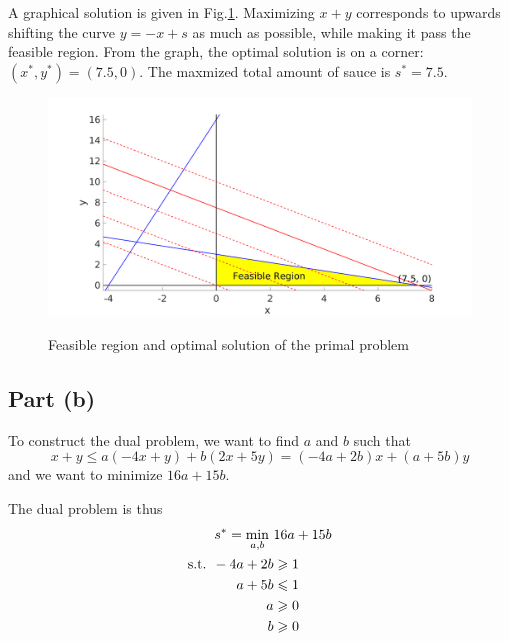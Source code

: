 \documentclass{article}
\begin{document}
A graphical solution is given in Fig.\ref{primal}. Maximizing $x+y$ corresponds to upwards shifting the curve $y=-x+s$ as much as possible, while making it pass the feasible region. From the graph, the optimal solution is on a corner: $(x^*,y^*)=(7.5,0)$. The maxmized total amount of sauce is $s^*=7.5$.
\begin{figure}[!htbp]
\centering
\includegraphics[width=12cm]{problem2a.png}\\
\caption{Feasible region and optimal solution of the primal problem}\label{primal}
\end{figure}

\subsection{Part (b)}
To construct the dual problem, we want to find $a$ and $b$ such that
\begin{equation*}
x+y\leqslant a(-4x+y)+b(2x+5y)=(-4a+2b)x+(a+5b)y
\end{equation*}
and we want to minimize $16a+15b$.

The dual problem is thus
\begin{align*}
s^*=\min_{a,b}~&16a+15b\\
\textup{s.t. }-4a+2b&\geqslant1\\
a+5b&\leqslant1\\
a&\geqslant0\\
b&\geqslant0
\end{align*}
\end{document}
